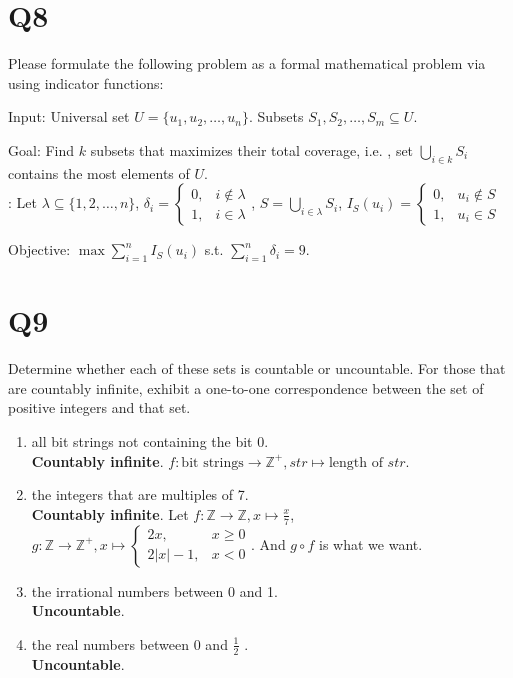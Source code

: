 \documentclass[11pt]{article}
\newenvironment{qparts}{\begin{enumerate}[{(}a{)}]}{\end{enumerate}}
\newenvironment{solution}{{\bf Solution}:}{\smallskip}
\begin{document}
\section*{Q8}
Please formulate the following problem as a formal
mathematical problem via using indicator functions:

Input:
Universal set $U=\{ u_1,u_2, \ldots ,u_n \}$. Subsets $S_1,
S_2, \ldots ,S_m \subseteq U$.

Goal:
Find $k$ subsets that maximizes their total coverage, i.e. ,
set $\bigcup_{i \in k}S_i$ contains the most elements of $U$.
\\
\begin{solution}
    Let $\lambda \subseteq \{ 1,2, \ldots ,n \}$,
    $\delta_i=\begin{cases}
        0,&i \notin \lambda\\
        1,&i \in \lambda
    \end{cases}$,
    $S=\bigcup_{i \in \lambda} S_i$,
    $I_S(u_i)=
    \begin{cases}
        0,&u_i\notin S\\
        1,&u_i \in S
    \end{cases}$

    Objective: $\max \sum_{i=1}^{n}I_S(u_i)$
    s.t. $\sum_{i=1}^{n}\delta_i=9$.

\end{solution}

\section*{Q9}
Determine whether each of these sets is countable or
uncountable. For those that are countably inﬁnite, exhibit a
one-to-one correspondence between the set of positive integers
and that set.
\begin{qparts}
    
    \item all bit strings not containing the bit 0.\\
    \textbf{Countably inﬁnite}. $f \colon \text{bit strings} \to \mathbb{Z}^{+}, str \mapsto \text{length of }str$.
    
    \item the integers that are multiples of 7.\\
    \textbf{Countably inﬁnite}. Let $f \colon \mathbb{Z} 
    \to \mathbb{Z}, x \mapsto \frac{x}{7}$,
    $g \colon \mathbb{Z} \to \mathbb{Z}^{+}, x \mapsto 
    \begin{cases}
        2x,&x\ge 0\\
        2\left\vert x  \right\vert -1,&x<0
    \end{cases}$.
    And $g \circ f$ is what we want.
    
    \item the irrational numbers between 0 and 1.\\
    \textbf{Uncountable}.
    
    \item the real numbers between 0 and $\frac{1}{2}$ .\\
    \textbf{Uncountable}.

\end{qparts}
\end{document}
